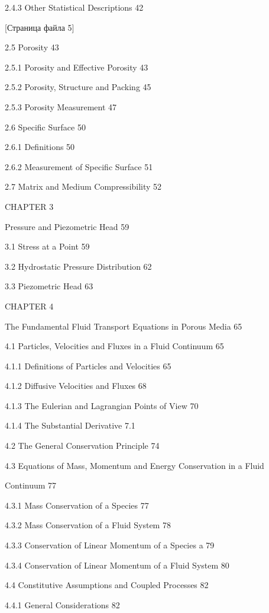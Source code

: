 \documentclass[
  11pt,
]{article}
\begin{document}
2.4.3 Other Statistical Descriptions 42 \par
\smallskip
\smallskip
\smallskip
{[}Страница файла 5{]}\par
2.5 Porosity 43 \par
2.5.1 Porosity and Effective Porosity 43 \par
2.5.2 Porosity, Structure and Packing 45 \par
2.5.3 Porosity Measurement 47 \par
2.6 Specific Surface 50 \par
2.6.1 Definitions 50 \par
2.6.2 Measurement of Specific Surface 51 \par
2.7 Matrix and Medium Compressibility 52 \par
CHAPTER 3 \par
Pressure and Piezometric Head 59 \par
3.1 Stress at a Point 59 \par
3.2 Hydrostatic Pressure Distribution 62 \par
3.3 Piezometric Head 63 \par
CHAPTER 4 \par
The Fundamental Fluid Transport Equations in Porous Media 65 \par
4.1 Particles, Velocities and Fluxes in a Fluid Continuum 65 \par
\textquotesingle{} 4.1.1 Definitions of Particles and Velocities 65 \par
4.1.2 Diffusive Velocities and Fluxes 68 \par
4.1.3 The Eulerian and Lagrangian Points of View 70 \par
4.1.4 The Substantial Derivative 7.1 \par
4.2 The General Conservation Principle 74 \par
4.3 Equations of Mass, Momentum and Energy Conservation in a Fluid \par
Continuum 77 \par
4.3.1 Mass Conservation of a Species 77 \par
4.3.2 Mass Conservation of a Fluid System 78 \par
4.3.3 Conservation of Linear Momentum of a Species a 79 \par
4.3.4 Conservation of Linear Momentum of a Fluid System 80 \par
4.4 Constitutive Assumptions and Coupled Processes 82 \par
4.4.1 General Considerations 82 \par
\end{document}
